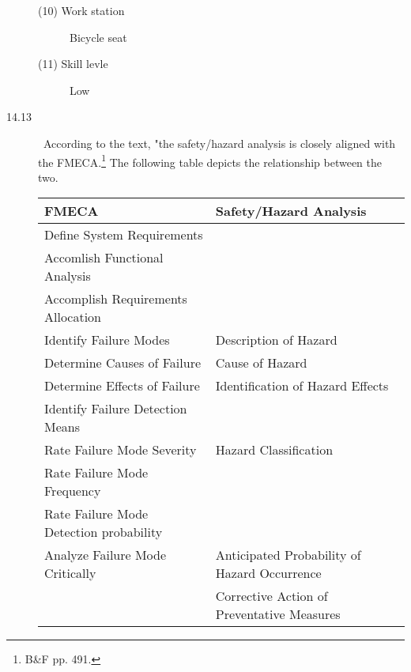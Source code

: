 \documentclass[letterpaper,10pt]{article}
\begin{document}
\begin{description}
\begin{description}
	\item[(10) Work station] Bicycle seat
	\item[(11) Skill levle] Low
\end{description}
\item[14.13]\ According to the text, "the safety/hazard analysis is closely aligned with the FMECA.\footnote{B\&F pp. 491.}  The following table depicts the relationship between the two.
\begin{center}
	\begin{tabular}{ll}
	\hline
	\textbf{FMECA} & \textbf{Safety/Hazard Analysis} \\
	\hline
	Define System Requirements & \\
	Accomlish Functional Analysis & \\
	Accomplish Requirements Allocation & \\
	Identify Failure Modes & Description of Hazard \\
	Determine Causes of Failure & Cause of Hazard \\
	Determine Effects of Failure & Identification of Hazard Effects \\
	Identify Failure Detection Means & \\
	Rate Failure Mode Severity & Hazard Classification \\
	Rate Failure Mode Frequency & \\
	Rate Failure Mode Detection probability & \\
	Analyze Failure Mode Critically & Anticipated Probability of Hazard Occurrence\\
	& Corrective Action of Preventative Measures \\
	\hline
	\end{tabular}
\end{center}
\end {description}
\end{document}
